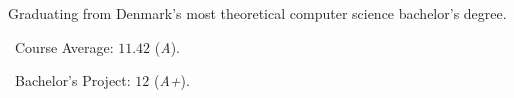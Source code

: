 Graduating from Denmark's most theoretical computer science bachelor's degree.

\medskip

\faFileO\ Course Average: $11.42$ (\emph{A}).

\faFileO\ Bachelor's Project: $12$ (\emph{A+}).

